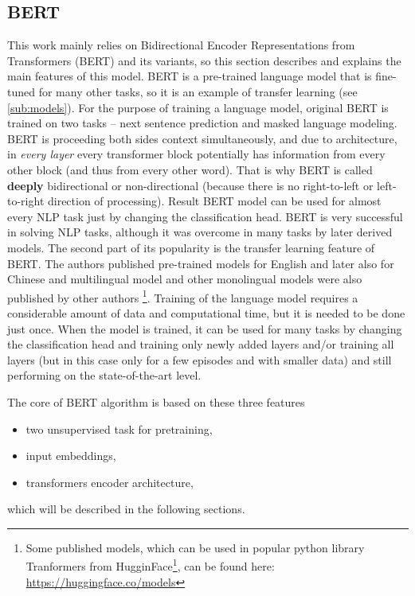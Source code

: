 \subsection{BERT}
This work mainly relies on Bidirectional Encoder Representations from Transformers (BERT) \citep{Devlin2019} and its variants, so this section describes and explains the main features of this model. BERT is a pre-trained language model that is fine-tuned for many other tasks, so it is an example of transfer learning (see \ref{sub:models}).
For the purpose of training a language model, original BERT is trained on two tasks -- next sentence prediction and masked language modeling. BERT is proceeding both sides context simultaneously, and due to architecture, in \textit{every layer} every transformer block potentially has information from every other block (and thus from every other word). That is why BERT is called \textbf{deeply} bidirectional or non-directional (because there is no right-to-left or left-to-right direction of processing). Result BERT model can be used for almost every NLP task just by changing the classification head. BERT is very successful in solving NLP tasks, although it was overcome in many tasks by later derived models. 
The second part of its popularity is the transfer learning feature of BERT. The authors
published pre-trained models for English and later also for Chinese and multilingual model and other monolingual models were also published by other authors \footnote{Some published models, which can be used in popular python library Tranformers from HugginFace\footnote{https://huggingface.co/}, can be found here: \url{https://huggingface.co/models}}. Training of the language model requires a considerable amount of data and computational time, but it is needed to be done just once. When the model is trained, it can be used for many tasks by changing the classification head and training only newly added layers and/or training all layers (but in this case only for a few episodes and with smaller data) and still performing on the state-of-the-art level. 
\par
The core of BERT algorithm is based on these three features
\begin{itemize}
\item two unsupervised task for pretraining,
\item input embeddings,
\item transformers encoder architecture,
\end{itemize}
which will be described in the following sections.
